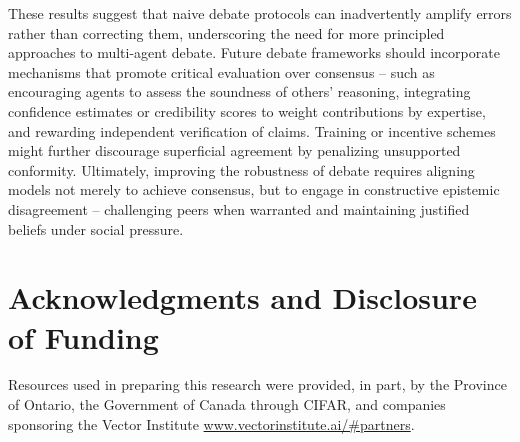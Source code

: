 \documentclass{article}
\begin{document}
These results suggest that naive debate protocols can inadvertently amplify errors rather than correcting them, underscoring the need for more principled approaches to multi-agent debate. Future debate frameworks should incorporate mechanisms that promote critical evaluation over consensus -- such as encouraging agents to assess the soundness of others' reasoning, integrating confidence estimates or credibility scores to weight contributions by expertise, and rewarding independent verification of claims. Training or incentive schemes might further discourage superficial agreement by penalizing unsupported conformity. Ultimately, improving the robustness of debate requires aligning models not merely to achieve consensus, but to engage in constructive epistemic disagreement -- challenging peers when warranted and maintaining justified beliefs under social pressure.

\section*{Acknowledgments and Disclosure of Funding}
Resources used in preparing this research were provided, in part, by the Province of Ontario, the Government of Canada through CIFAR, and companies sponsoring the Vector Institute \url{www.vectorinstitute.ai/#partners}.






\appendix
\end{document}
